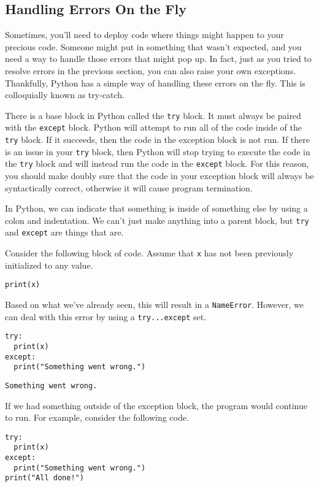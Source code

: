 \subsection{Handling Errors On the Fly}
Sometimes, you'll need to deploy code where things might happen to your precious code. Someone might put in something that wasn't expected, and you need a way to handle those errors that might pop up. In fact, just as you tried to resolve errors in the previous section, you can also raise your own exceptions. Thankfully, Python has a simple way of handling these errors on the fly. This is colloquially known as try-catch.\par
There is a base block in Python called the \verb|try| block. It must always be paired with the \verb|except| block. Python will attempt to run all of the code inside of the \verb|try| block. If it succeeds, then the code in the exception block is not run. If there is an issue in your \verb|try| block, then Python will stop trying to execute the code in the \verb|try| block and will instead run the code in the \verb|except| block. For this reason, you should make doubly sure that the code in your exception block will always be syntactically correct, otherwise it will cause program termination.\par
In Python, we can indicate that something is inside of something else by using a colon and indentation. We can't just make anything into a parent block, but \verb|try| and \verb|except| are things that are.\par
Consider the following block of code. Assume that \verb|x| has not been previously initialized to any value.\par
\begin{lstlisting}[style=pippython]
print(x)
\end{lstlisting}
Based on what we've already seen, this will result in a \verb|NameError|. However, we can deal with this error by using a \verb|try...except| set.
\begin{lstlisting}[style=pippython]
try:
  print(x)
except:
  print("Something went wrong.")
\end{lstlisting}
\begin{lstlisting}
Something went wrong.
\end{lstlisting}
If we had something outside of the exception block, the program would continue to run. For example, consider the following code.
\begin{lstlisting}[style=pippython]
try:
  print(x)
except:
  print("Something went wrong.")
print("All done!")
\end{lstlisting}
